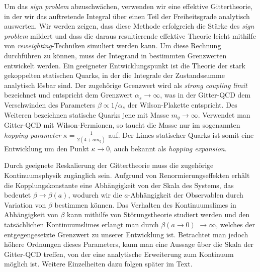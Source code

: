 Um das \emph{sign problem} abzuschwächen, verwenden wir eine effektive
Gittertheorie, in der wir das auftretende Integral über einen Teil der
Freiheitsgrade analytisch auswerten. Wir werden zeigen, dass diese Methode
erfolgreich die Stärke des \emph{sign problem} mildert und dass die daraus
resultierende effektive Theorie leicht mithilfe von \emph{reweighting}-Tech\-ni\-ken
simuliert werden kann. Um diese Rechnung durchführen zu können, muss der
Integrand in bestimmten Grenzwerten entwickelt werden. Ein geeigneter
Entwicklungs\-punkt ist die Theorie der stark gekoppelten statischen Quarks, in
der die Integrale der Zu\-stands\-summe analytisch lösbar sind. Der zugehörige
Grenzwert wird als \emph{strong coupling limit} bezeichnet und entspricht dem
Grenzwert $\alpha_s \to \infty$, was in der Gitter-QCD dem Verschwinden des
Parameters $\beta \propto 1/\alpha_s$ der Wilson-Plakette entspricht. Des
Weiteren bezeichnen statische Quarks jene mit Masse  $m_q \to \infty$. Verwendet
man Gitter-QCD mit Wilson-Fermionen, so taucht die Masse nur im sogenannten
\emph{hopping parameter} $\kappa = \frac{1}{2(4 + a m_q)}$ auf. Der Limes
statischer Quarks ist somit eine Entwicklung um den Punkt $\kappa \to 0$, auch
bekannt als \emph{hopping expansion}.

Durch geeignete Reskalierung der Gittertheorie muss die zugehörige
Kontinuums\-phy\-sik zugänglich sein. Aufgrund von Renormierungseffekten erhält die
Kopplungskonstante eine Abhängigkeit von der Skala des Systems, das bedeutet
$\beta \to \beta(a)$, wodurch wir die $a$-Abhängigkeit der Observablen durch
Variation von $\beta$ bestimmen können. Das Verhalten des Kontinuumslimes in
Abhängigkeit von $\beta$ kann mithilfe von Störungstheorie studiert werden und
den tatsächlichen Kontinuumslimes erlangt man durch $\beta(a \to 0)$ $\to \infty$,
welches der entgegengesetzte Grenzwert zu unserer Entwicklung ist. Betrachtet
man jedoch höhere Ordnungen dieses Parameters, kann man eine Aussage über die
Skala der Gitter-QCD treffen, von der eine analytische Erweiterung zum Kontinuum
möglich ist. Weitere Einzelheiten dazu folgen später im Text.

